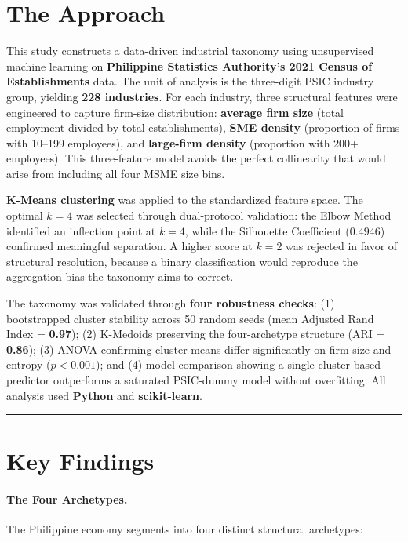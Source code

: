 \documentclass[10pt]{article}
\begin{document}
%
%
\section*{The Approach}

This study constructs a data-driven industrial taxonomy using unsupervised machine learning on \textbf{Philippine Statistics Authority's 2021 Census of Establishments} data. The unit of analysis is the three-digit PSIC industry group, yielding \textbf{228 industries}. For each industry, three structural features were engineered to capture firm-size distribution: \textbf{average firm size} (total employment divided by total establishments), \textbf{SME density} (proportion of firms with 10--199 employees), and \textbf{large-firm density} (proportion with 200+ employees). This three-feature model avoids the perfect collinearity that would arise from including all four MSME size bins.

\textbf{K-Means clustering} was applied to the standardized feature space. The optimal $k = 4$ was selected through dual-protocol validation: the Elbow Method identified an inflection point at $k = 4$, while the Silhouette Coefficient ($0.4946$) confirmed meaningful separation. A higher score at $k = 2$ was rejected in favor of structural resolution, because a binary classification would reproduce the aggregation bias the taxonomy aims to correct.

The taxonomy was validated through \textbf{four robustness checks}: (1) bootstrapped cluster stability across 50 random seeds (mean Adjusted Rand Index = \textbf{0.97}); (2) K-Medoids preserving the four-archetype structure (ARI = \textbf{0.86}); (3) ANOVA confirming cluster means differ significantly on firm size and entropy ($p < 0.001$); and (4) model comparison showing a single cluster-based predictor outperforms a saturated PSIC-dummy model without overfitting. All analysis used \textbf{Python} and \textbf{scikit-learn}.

\vspace{0.2em}
\hrule
\vspace{0.25em}

%
%
\section*{Key Findings}

\paragraph{The Four Archetypes.} The Philippine economy segments into four distinct structural archetypes:
\end{document}
